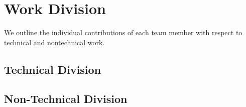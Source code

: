 
\section{Work Division}
\label{sec:work_division}

We outline the individual contributions of each team member with respect to technical and nontechnical work. 

\subsection{Technical Division}
\label{sec:technical_division}


\subsection{Non-Technical Division}
\label{sec:nontechnical_division}

